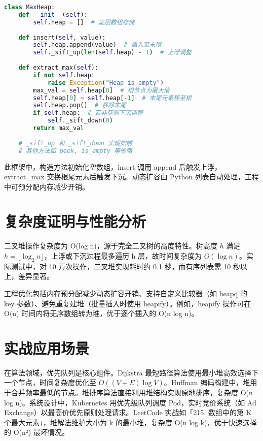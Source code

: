 \begin{lstlisting}[language=python]
class MaxHeap:
    def __init__(self):
        self.heap = []  # 底层数组存储
    
    def insert(self, value):
        self.heap.append(value)  # 插入至末尾
        self._sift_up(len(self.heap) - 1)  # 上浮调整
    
    def extract_max(self):
        if not self.heap:
            raise Exception("Heap is empty")
        max_val = self.heap[0]  # 根节点为最大值
        self.heap[0] = self.heap[-1]  # 末尾元素移至根
        self.heap.pop()  # 移除末尾
        if self.heap:  # 若非空则下沉调整
            self._sift_down(0)
        return max_val
    
    # _sift_up 和 _sift_down 实现如前
    # 其他方法如 peek, is_empty 等省略
\end{lstlisting}
此框架中，构造方法初始化空数组，insert 调用 append 后触发上浮，extract\_{}max 交换根尾元素后触发下沉。动态扩容由 Python 列表自动处理，工程中可预分配内存减少开销。\par
\chapter{复杂度证明与性能分析}
二叉堆操作复杂度为 O(log n)，源于完全二叉树的高度特性。树高度 $h$ 满足 $h = \lfloor \log_2 n \rfloor$，上浮或下沉过程最多遍历 h 层，故时间复杂度为 $O(\log n)$。实际测试中，对 10 万次操作，二叉堆实现耗时约 0.1 秒，而有序列表需 10 秒以上，差异显著。\par
工程优化包括内存预分配减少动态扩容开销、支持自定义比较器（如 heapq 的 key 参数）、避免重复建堆（批量插入时使用 heapify）。例如，heapify 操作可在 O(n) 时间内将无序数组转为堆，优于逐个插入的 O(n log n)。\par
\chapter{实战应用场景}
在算法领域，优先队列是核心组件。Dijkstra 最短路径算法使用最小堆高效选择下一个节点，时间复杂度优化至 $O((V+E)\log V)$。Huffman 编码构建中，堆用于合并频率最低的节点。堆排序算法直接利用堆结构实现原地排序，复杂度 O(n log n)。系统设计中，Kubernetes 用优先级队列调度 Pod，实时竞价系统（如 Ad Exchange）以最高价优先原则处理请求。LeetCode 实战如「215. 数组中的第 K 个最大元素」，堆解法维护大小为 k 的最小堆，复杂度 O(n log k)，优于快速选择的 O(n²) 最坏情况。\par
